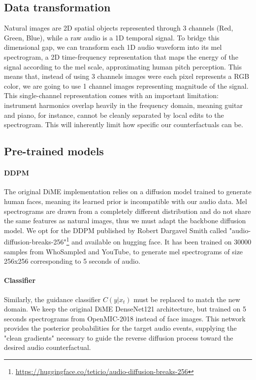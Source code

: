 \documentclass[11pt]{article}
\begin{document}
\subsection{Data transformation}

Natural images are 2D spatial objects represented through 3 channels
(Red, Green, Blue), while a raw audio is a 1D temporal signal. To
bridge this dimensional gap, we can transform each 1D audio waveform
into its mel spectrogram, a 2D time-frequency representation that
maps the energy of the signal according to the mel scale,
approximating human pitch perception. This means that, instead of
using 3 channels images were each pixel represents a RGB color, we
are going to use 1 channel images representing magnitude of the signal.
This single-channel representation comes with an important
limitation: instrument harmonics overlap heavily in the frequency
domain, meaning guitar and piano, for instance, cannot be cleanly
separated by local edits to the spectrogram. This will inherently
limit how specific our counterfactuals can be.

\subsection{Pre-trained models}

\paragraph{DDPM}
The original DiME implementation relies on a diffusion model trained
to generate human faces, meaning its learned prior is incompatible
with our audio data. Mel spectrograms are drawn from a completely
different distribution and do not share the same features as natural
images, thus we must adapt the backbone diffusion model. We opt for
the DDPM published by Robert Dargavel Smith called
"audio-diffusion-breaks-256"\footnote{\url{https://huggingface.co/teticio/audio-diffusion-breaks-256}}
and available on hugging face. It has been trained on 30000 samples
from WhoSampled and YouTube, to generate mel spectrograms of size
256x256 corresponding to 5 seconds of audio.

\paragraph{Classifier}
Similarly, the guidance classifier $C(y|x_t)$ must be replaced to
match the new domain. We keep the original DiME DenseNet121
architecture, but trained on 5 seconds spectrograms from OpenMIC-2018
instead of face images. This network provides the posterior
probabilities for the target audio events, supplying the "clean
gradients" necessary to guide the reverse diffusion process toward
the desired audio counterfactual.
\end{document}
